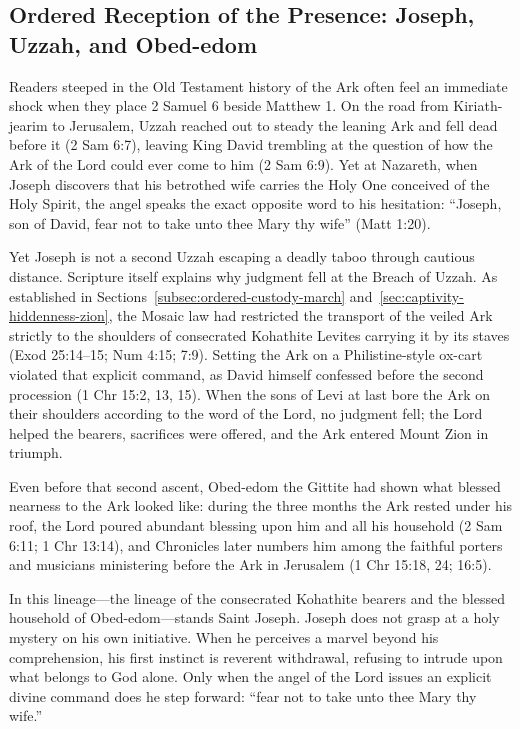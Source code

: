 \subsection{Ordered Reception of the Presence: Joseph, Uzzah, and Obed-edom}\label{subsec:joseph-uzzah-obed-edom}

Readers steeped in the Old Testament history of the Ark often feel an immediate shock when they place 2 Samuel 6 beside Matthew 1. On the road from Kiriath-jearim to Jerusalem, Uzzah reached out to steady the leaning Ark and fell dead before it (2 Sam 6:7), leaving King David trembling at the question of how the Ark of the Lord could ever come to him (2 Sam 6:9). Yet at Nazareth, when Joseph discovers that his betrothed wife carries the Holy One conceived of the Holy Spirit, the angel speaks the exact opposite word to his hesitation: ``Joseph, son of David, fear not to take unto thee Mary thy wife'' (Matt 1:20).

Yet Joseph is not a second Uzzah escaping a deadly taboo through cautious distance. Scripture itself explains why judgment fell at the Breach of Uzzah. As established in Sections~\ref{subsec:ordered-custody-march} and~\ref{sec:captivity-hiddenness-zion}, the Mosaic law had restricted the transport of the veiled Ark strictly to the shoulders of consecrated Kohathite Levites carrying it by its staves (Exod 25:14--15; Num 4:15; 7:9). Setting the Ark on a Philistine-style ox-cart violated that explicit command, as David himself confessed before the second procession (1 Chr 15:2, 13, 15). When the sons of Levi at last bore the Ark on their shoulders according to the word of the Lord, no judgment fell; the Lord helped the bearers, sacrifices were offered, and the Ark entered Mount Zion in triumph.

Even before that second ascent, Obed-edom the Gittite had shown what blessed nearness to the Ark looked like: during the three months the Ark rested under his roof, the Lord poured abundant blessing upon him and all his household (2 Sam 6:11; 1 Chr 13:14), and Chronicles later numbers him among the faithful porters and musicians ministering before the Ark in Jerusalem (1 Chr 15:18, 24; 16:5).

In this lineage---the lineage of the consecrated Kohathite bearers and the blessed household of Obed-edom---stands Saint Joseph. Joseph does not grasp at a holy mystery on his own initiative. When he perceives a marvel beyond his comprehension, his first instinct is reverent withdrawal, refusing to intrude upon what belongs to God alone. Only when the angel of the Lord issues an explicit divine command does he step forward: ``fear not to take unto thee Mary thy wife.''


